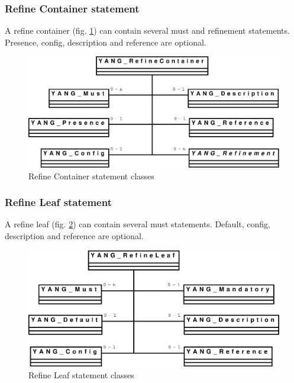 \documentclass[a4paper]{article}
\begin{document}
\subsubsection{Refine Container statement}

A refine container (fig. \ref{refinecontainer}) can contain several
must  and  refinement  statements.  Presence, config,  description  and
reference are optional.
\begin{figure}[htbp]
\begin{center}
\includegraphics[scale = .3]{refinecontainer.eps}
\end{center}
\caption{Refine Container statement classes}
\label{refinecontainer}
\end{figure}

\subsubsection{Refine Leaf statement}

A  refine leaf  (fig.  \ref{refineleaf}) can  contain several  must
statements.  Default, config, description and reference are optional.
\begin{figure}[htbp]
\begin{center}
\includegraphics[scale = .3]{refineleaf.eps}
\end{center}
\caption{Refine Leaf statement classes}
\label{refineleaf}
\end{figure}
\end{document}
